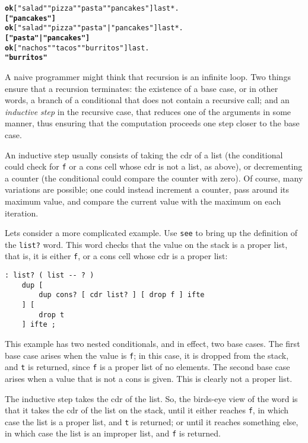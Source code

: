 \documentclass[english]{book}
\begin{document}
\begin{alltt}
\textbf{ok} {[} "salad" "pizza" "pasta" "pancakes" {]} last* .
\textbf{{[} "pancakes" {]}}
\textbf{ok} {[} "salad" "pizza" "pasta" | "pancakes" {]} last* .
\textbf{{[} "pasta" | "pancakes" {]}}
\textbf{ok} {[} "nachos" "tacos" "burritos" {]} last .
\textbf{"burritos"}
\end{alltt}

A naive programmer might think that recursion is an infinite loop. Two things ensure that a recursion terminates: the existence of a base case, or in other words, a branch of a conditional that does not contain a recursive call; and an \emph{inductive step} in the recursive case, that reduces one of the arguments in some manner, thus ensuring that the computation proceeds one step closer to the base case.

An inductive step usually consists of taking the cdr of a list (the conditional could check for \texttt{f} or a cons cell whose cdr is not a list, as above), or decrementing a counter (the conditional could compare the counter with zero). Of course, many variations are possible; one could instead increment a counter, pass around its maximum value, and compare the current value with the maximum on each iteration.

Lets consider a more complicated example. Use \texttt{see} to bring up the definition of the \texttt{list?} word. This word checks that the value on the stack is a proper list, that is, it is either \texttt{f}, or a cons cell whose cdr is a proper list:

\begin{verbatim}
: list? ( list -- ? )
    dup [
        dup cons? [ cdr list? ] [ drop f ] ifte
    ] [
        drop t
    ] ifte ;
\end{verbatim}

This example has two nested conditionals, and in effect, two base cases. The first base case arises when the value is \texttt{f}; in this case, it is dropped from the stack, and \texttt{t} is returned, since \texttt{f} is a proper list of no elements. The second base case arises when a value that is not a cons is given. This is clearly not a proper list.

The inductive step takes the cdr of the list. So, the birds-eye view of the word is that it takes the cdr of the list on the stack, until it either reaches \texttt{f}, in which case the list is a proper list, and \texttt{t} is returned; or until it reaches something else, in which case the list is an improper list, and \texttt{f} is returned.
\end{document}
